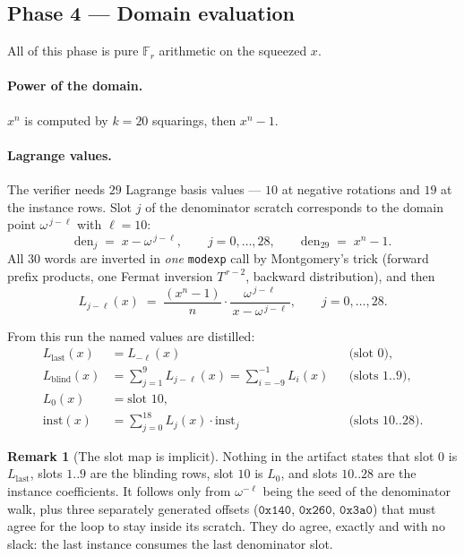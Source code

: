 \documentclass[11pt,a4paper]{article}
\newcommand{\Fr}{\ensuremath{\mathbb{F}_{r}}}
\newcommand{\code}[1]{\texttt{#1}}
\theoremstyle{definition}
\newtheorem{remark}{Remark}[section]
\begin{document}
\subsection{Phase 4 --- Domain evaluation}
\label{sec:lagrange}

All of this phase is pure $\Fr$ arithmetic on the squeezed $x$.

\paragraph{Power of the domain.}
$x^{n}$ is computed by $k=20$ squarings, then $x^{n}-1$.

\paragraph{Lagrange values.}
The verifier needs $29$ Lagrange basis values --- $10$ at negative rotations
and $19$ at the instance rows. Slot $j$ of the denominator scratch
corresponds to the domain point $\omega^{\,j-\ell}$ with $\ell = 10$:
\[
\mathrm{den}_j \;=\; x - \omega^{\,j-\ell},
\qquad j = 0,\dots,28,
\qquad
\mathrm{den}_{29} \;=\; x^{n}-1 .
\]
All $30$ words are inverted in \emph{one} \code{modexp} call by Montgomery's
trick (forward prefix products, one Fermat inversion $T^{\,r-2}$, backward
distribution), and then
\begin{equation}
L_{j-\ell}(x)
\;=\;
\frac{(x^{n}-1)}{n}\cdot\frac{\omega^{\,j-\ell}}{\,x-\omega^{\,j-\ell}\,},
\qquad j = 0,\dots,28 .
\end{equation}

From this run the named values are distilled:
\begin{align}
L_{\mathrm{last}}(x) &= L_{-\ell}(x) &&\text{(slot } 0), \\
L_{\mathrm{blind}}(x) &= \sum_{j=1}^{9} L_{j-\ell}(x) = \sum_{i=-9}^{-1} L_i(x) &&\text{(slots } 1..9), \\
L_0(x) &= \text{slot } 10, \\
\mathrm{inst}(x) &= \sum_{j=0}^{18} L_j(x)\cdot \mathrm{inst}_j &&\text{(slots } 10..28).
\end{align}

\begin{remark}[The slot map is implicit]
Nothing in the artifact states that slot $0$ is $L_{\mathrm{last}}$, slots
$1..9$ are the blinding rows, slot $10$ is $L_0$, and slots $10..28$ are the
instance coefficients. It follows only from $\omega^{-\ell}$ being the seed of
the denominator walk, plus three separately generated offsets
($\mathtt{0x140}$, $\mathtt{0x260}$, $\mathtt{0x3a0}$) that must agree for the
loop to stay inside its scratch. They do agree, exactly and with no slack: the
last instance consumes the last denominator slot.
\end{remark}
\end{document}
